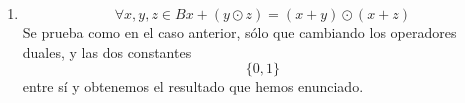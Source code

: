 \begin{enumerate}
\begin{enumerate}
\begin{enumerate}
\begin{enumerate}
\begin{enumerate}
        \item
          \[{= {{x \cdot {({{{{\overline{y} \cdot z} + {y \cdot \overline{z}}} + {y \cdot z}} + {\overline{y} \cdot \overline{z}}})}} + {\overline{x} \cdot {({{{{y \cdot z} + {y \cdot \overline{z}}} + {\overline{y} \cdot \overline{z}}} + {\overline{y} \cdot z}})}}}} =\]
        \item
          \[{= {{{{\overline{y} \cdot z} + {y \cdot \overline{z}}} + {y \cdot z}} + {\overline{y} \cdot \overline{z}}}} =\]
        \item
          \[{= {{\overline{y} \cdot {({z + \overline{z}})}} + {y \cdot {({z + \overline{z}})}}}} =\]
        \item
          \[{= {z + \overline{z}}} = 1\]
        \item
          \[\text{De}{\lbrack\mathbf{A}\rbrack}\text{y de}{\lbrack\mathbf{B}\rbrack}\text{se obtiene que}{\overline{({x\cdot{({y\oplus z})}})} = \overline{({{({x\cdot y})}\oplus{({x\cdot z})}})}}\]
        \item
          \[\text{Y de aquí, por la unicidad del complementario obtenemos}\]
        \item
          \[{{x \cdot {({y \oplus z})}} = {({x \cdot y})}} \oplus {({x \cdot z})}\]
        \end{enumerate}

        Es seguro que la prueba anterior puede ser acortada
        drásticamente, así que si al\-guno encuentra una forma (quizás
        más directa) la pondremos en su lugar.
      \item
        \[\forall x,y,{z \in B}{{x + {({y \odot z})}} = {({x + y})}} \odot {({x + z})}\]Se
        prueba como en el caso anterior, sólo que cambiando los
        operadores duales, y las dos constantes \[\{{0,1}\}\] entre sí y
        obtenemos el resultado que hemos enunciado.


\end{enumerate}
\end{enumerate}
\end{enumerate}
\end{enumerate}
